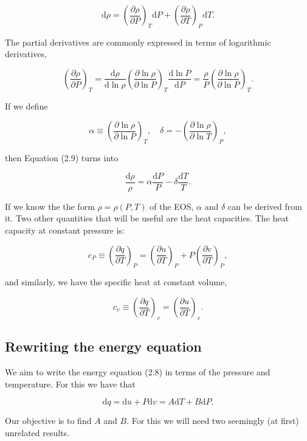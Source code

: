 \documentclass[twocolumn]{article}
\begin{document}
\[\mathrm{d}\rho = \left(\frac{\partial \rho}{\partial P}\right)_T\mathrm{d}P + \left(\frac{\partial\rho}{\partial T}\right)_P\mathrm{d}T. \tag{2.9}\]

The partial derivatives are commonly expressed in terms of logarithmic
derivatives,

\[\left(\frac{\partial \rho}{\partial P}\right)_T=\frac{\mathrm{d}\rho}{\mathrm{d}\ln \rho}\left(\frac{\partial \ln \rho}{\partial \ln P}\right)_T\frac{\mathrm{d}\ln P}{\mathrm{d}P}=\frac{\rho}{P}\left(\frac{\partial \ln \rho}{\partial \ln P}\right)_T.\]

If we define

\[\alpha\equiv \left(\frac{\partial \ln \rho}{\partial \ln P}\right)_T, \quad \delta=-\left(\frac{\partial\ln\rho}{\partial\ln T}\right)_P,\]

then Equation (2.9) turns into

\[\frac{\mathrm{d}\rho}{\rho}=\alpha\frac{\mathrm{d}P}{P}-\delta \frac{\mathrm{d}T}{T}.\]

If we know the the form \(\rho=\rho(P,T)\) of the EOS, \(\alpha\) and
\(\delta\) can be derived from it. Two other quantities that will be
useful are the heat capacities. The heat capacity at constant pressure
is:

\[c_P\equiv \left(\frac{\partial q}{\partial T}\right)_P=\left(\frac{\partial u}{\partial T}\right)_P+P\left(\frac{\partial v}{\partial T}\right)_P,\]

and similarly, we have the specific heat at constant volume,

\[c_v\equiv \left(\frac{\partial q}{\partial T}\right)_v=\left(\frac{\partial u}{\partial T}\right)_v.\]

\hypertarget{rewriting-the-energy-equation}{%
\subsection{Rewriting the energy
equation}\label{rewriting-the-energy-equation}}

We aim to write the energy equation (2.8) in terms of the pressure and
temperature. For this we have that

\[\mathrm{d}q=\mathrm{d}u+P\mathrm{d}v=A\mathrm{d}T+B\mathrm{d}P.\]

Our objective is to find \(A\) and \(B\). For this we will need two
seemingly (at first) unrelated results.
\end{document}
